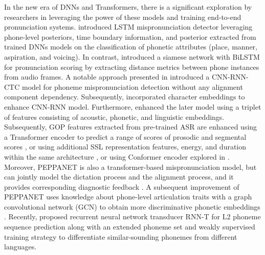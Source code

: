 \documentclass[11pt]{article}
\begin{document}

In the new era of DNNs and Transformers, there is a significant exploration by researchers in leveraging the power of these models and training end-to-end pronunciation systems. \citet{li2017improving} introduced LSTM mispronunciation detector leveraging phone-level posteriors, time boundary information, and posterior extracted from trained DNNs models on the classification of phonetic attributes (place, manner, aspiration, and voicing). In contrast, \citet{kyriakopoulos2018deep} introduced a siamese network with BiLSTM for pronunciation scoring by extracting distance metrics between phone instances from audio frames. A notable approach presented in \citet{leung2019cnn} introduced a CNN-RNN-CTC model for phoneme mispronunciation detection without any alignment component dependency. Subsequently, \citet{9052975} incorporated character embeddings to enhance CNN-RNN model. Furthermore, \citet{9746604} enhanced the later model using a triplet of features consisting of acoustic, phonetic, and linguistic embeddings. Subsequently, GOP features extracted from pre-trained ASR are enhanced using a Transformer encoder to predict a range of scores of prosodic and segmental scores \cite{JIM}, or using additional SSL representation features, energy, and duration within the same architecture \cite{3M}, or using Conformer encoder explored in \cite{fan2023multifaceted}. Moreover, PEPPANET is also a transformer-based mispronunciation model, but can jointly model the dictation process and the alignment process, and it provides corresponding diagnostic feedback \cite{10022472}. A subsequent improvement of PEPPANET uses knowledge about phone-level articulation traits with a graph convolutional network (GCN) to obtain more discriminative phonetic embeddings \cite{10097226}. Recently, \citet{zhang2023phonetic} proposed recurrent neural network transducer RNN-T for L2 phoneme sequence prediction along with an extended phoneme set and weakly supervised training strategy to differentiate similar-sounding phonemes from different languages. 

\end{document}
